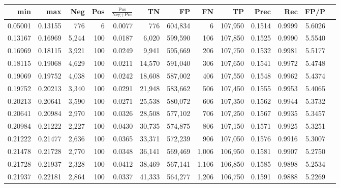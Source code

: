\begin{tabular}{rrrrrrrrrrrrr}
\toprule
    min &     max &   Neg & Pos & $\frac{\text{Pos}}{\text{Neg}+\text{Pos}}$ &      TN &      FP &      FN &      TP &   Prec &    Rec &   FP/P \\
\midrule
0.05001 & 0.13155 &   776 &   6 &                                     0.0077 &     776 & 604,834 &       6 & 107,950 & 0.1514 & 0.9999 & 5.6026 \\
0.13167 & 0.16969 & 5,244 & 100 &                                     0.0187 &   6,020 & 599,590 &     106 & 107,850 & 0.1525 & 0.9990 & 5.5540 \\
0.16969 & 0.18115 & 3,921 & 100 &                                     0.0249 &   9,941 & 595,669 &     206 & 107,750 & 0.1532 & 0.9981 & 5.5177 \\
0.18115 & 0.19068 & 4,629 & 100 &                                     0.0211 &  14,570 & 591,040 &     306 & 107,650 & 0.1541 & 0.9972 & 5.4748 \\
0.19069 & 0.19752 & 4,038 & 100 &                                     0.0242 &  18,608 & 587,002 &     406 & 107,550 & 0.1548 & 0.9962 & 5.4374 \\
0.19752 & 0.20213 & 3,340 & 100 &                                     0.0291 &  21,948 & 583,662 &     506 & 107,450 & 0.1555 & 0.9953 & 5.4065 \\
0.20213 & 0.20641 & 3,590 & 100 &                                     0.0271 &  25,538 & 580,072 &     606 & 107,350 & 0.1562 & 0.9944 & 5.3732 \\
0.20641 & 0.20984 & 2,970 & 100 &                                     0.0326 &  28,508 & 577,102 &     706 & 107,250 & 0.1567 & 0.9935 & 5.3457 \\
0.20984 & 0.21222 & 2,227 & 100 &                                     0.0430 &  30,735 & 574,875 &     806 & 107,150 & 0.1571 & 0.9925 & 5.3251 \\
0.21222 & 0.21477 & 2,636 & 100 &                                     0.0365 &  33,371 & 572,239 &     906 & 107,050 & 0.1576 & 0.9916 & 5.3007 \\
0.21478 & 0.21728 & 2,770 & 100 &                                     0.0348 &  36,141 & 569,469 &   1,006 & 106,950 & 0.1581 & 0.9907 & 5.2750 \\
0.21728 & 0.21937 & 2,328 & 100 &                                     0.0412 &  38,469 & 567,141 &   1,106 & 106,850 & 0.1585 & 0.9898 & 5.2534 \\
0.21937 & 0.22181 & 2,864 & 100 &                                     0.0337 &  41,333 & 564,277 &   1,206 & 106,750 & 0.1591 & 0.9888 & 5.2269 \\

\end{tabular}
